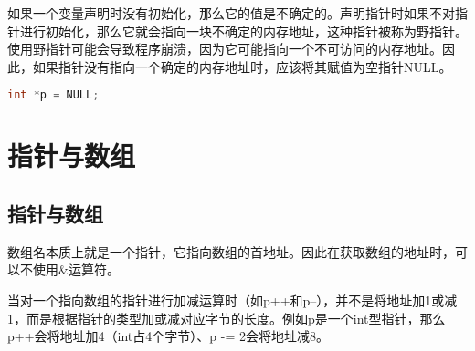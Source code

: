 如果一个变量声明时没有初始化，那么它的值是不确定的。声明指针时如果不对指针进行初始化，那么它就会指向一块不确定的内存地址，这种指针被称为野指针。\\

使用野指针可能会导致程序崩溃，因为它可能指向一个不可访问的内存地址。因此，如果指针没有指向一个确定的内存地址时，应该将其赋值为空指针NULL。

\vspace{-0.5cm}

\begin{lstlisting}[language=C++]
int *p = NULL;
\end{lstlisting}

\newpage

\section{指针与数组}

\subsection{指针与数组}

数组名本质上就是一个指针，它指向数组的首地址。因此在获取数组的地址时，可以不使用\&运算符。\\

\begin{figure}[H]
    \centering
\end{figure}

当对一个指向数组的指针进行加减运算时（如p++和p--），并不是将地址加1或减1，而是根据指针的类型加或减对应字节的长度。例如p是一个int型指针，那么p++会将地址加4（int占4个字节）、p -= 2会将地址减8。\\

